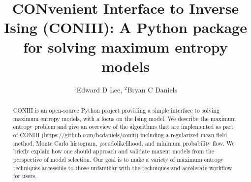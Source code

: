 \documentclass[aps,prl,twocolumn,nofootinbib]{revtex4-1}
\begin{document}
\newcommand{\mr}[1]{\mathrm{#1}}
\newcommand{\mb}[1]{\mathbf{#1}}
\newcommand{\br}[1]{\left<#1\right>}
\newcommand{\bl}[1]{\left|#1\right|}
\newcommand{\mc}[1]{\mathcal{#1}}
\newcommand{\tb}[1]{\textcolor{blue}{#1}}
\newcommand{\tr}[1]{\textcolor{red}{#1}}
\newcommand{\tg}[1]{\textcolor{green}{#1}}
\newcommand{\si}[0]{\sigma_{\rm i}}
\newcommand{\sj}[0]{\sigma_{\rm j}}
\newcommand{\bs}[1]{\boldsymbol{#1}}
\newcommand{\rs}[0]{{\rm s}}
\newcommand{\rk}[0]{{\rm k}}

\title{CONvenient Interface to Inverse Ising (CONIII): A Python package for solving maximum entropy models}
\author{$^1$Edward D Lee, $^2$Bryan C Daniels}

\begin{abstract}
CONIII is an open-source Python project providing a simple interface to solving maximum entropy models, with a focus on the Ising model. We describe the maximum entropy problem and give an overview of the algorithms that are implemented as part of CONIII (\url{https://github.com/bcdaniels/coniii}) including a regularized mean field method, Monte Carlo histogram, pseudolikelihood, and minimum probability flow. We briefly explain how one should approach and validate maxent models from the perspective of model selection. Our goal is to make a variety of maximum entropy techniques accessible to those unfamiliar with the techniques and accelerate workflow for users.
\end{abstract}

\maketitle
\end{document}
